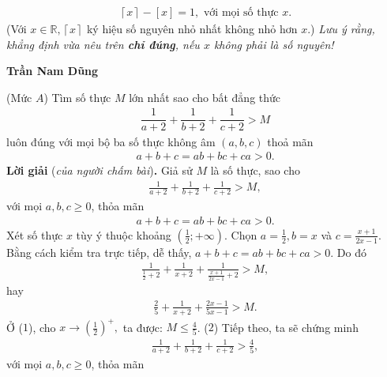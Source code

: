 \begin{multicols}{2}
\begin{align*}
		 \left\lceil x \right\rceil  - \left[ x \right] = 1, \text{ với mọi số thực } x.
	\end{align*}
	(Với $x \in \mathbb{R}, \left\lceil x \right\rceil $    ký hiệu số nguyên nhỏ nhất không nhỏ hơn $x$.)
	\vskip 0.05cm
	\textit{Lưu ý rằng, khẳng định vừa nêu trên \textbf{\color{thachthuctoanhoc}chỉ đúng}, nếu $x$ không phải là số nguyên!}
	\begin{flushright}
		\textbf{\color{thachthuctoanhoc}Trần Nam Dũng}
	\end{flushright}
	{}
	(Mức $A$) Tìm số thực $M$ lớn nhất sao cho bất đẳng thức 
	\begin{align*}
		\dfrac{1}{{a + 2}} + \dfrac{1}{{b + 2}} + \dfrac{1}{{c + 2}} > M
	\end{align*}
	luôn đúng với mọi bộ ba số thực không âm $(a,b,c)$ thoả mãn  
	\begin{align*}
		a+b+c=ab+bc+ca>0.
	\end{align*}
	\textbf{\color{thachthuctoanhoc}Lời giải} (\textit{của người chấm bài})\textbf{\color{thachthuctoanhoc}.}
	\vskip 0.05cm
	Giả sử $M$ là số thực, sao cho
	\begin{align*}
		\frac{1}{{a + 2}} + \frac{1}{{b + 2}} + \frac{1}{{c + 2}} > M,
	\end{align*}
	với mọi $a, b, c \ge  0$, thỏa mãn 
	\begin{align*}
		a + b + c = ab + bc + ca > 0.
	\end{align*}
	Xét số thực $x$ tùy ý thuộc khoảng $\left( {\frac{1}{2}; + \infty } \right).$
	\vskip 0.05cm 
	Chọn  $a = \frac{1}{2}, b = x$ và $c = \frac{x+1}{2x-1}$.
	\vskip 0.05cm
	Bằng cách kiểm tra trực tiếp, dễ thấy, $a + b + c = ab + bc + ca > 0$. Do đó
	\begin{align*}
		\frac{1}{{\frac{1}{2} + 2}} + \frac{1}{{x + 2}} + \frac{1}{{\frac{{x + 1}}{{2x - 1}} + 2}} > M,
	\end{align*}
	hay                                                                         \begin{align*}
		\frac{2}{5} + \frac{1}{{x + 2}} + \frac{{2x - 1}}{{5x - 1}} > M. \tag{$1$}
	\end{align*}
	Ở ($1$), cho $x \to {\left( {\frac{1}{2}} \right)^ + },$ ta được: $M \le \frac{4}{5}$. \hfill ($2$)
	\vskip 0.05cm
	Tiếp theo, ta sẽ chứng minh
	\begin{align*}
		\frac{1}{{a + 2}} + \frac{1}{{b + 2}} + \frac{1}{{c + 2}} > \frac{4}{5}, \tag{$3$}
	\end{align*}
	với mọi $a, b, c \ge  0$, thỏa mãn

\end{multicols}
